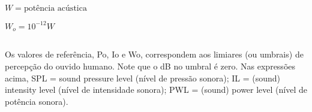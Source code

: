         $W = \text{potência acústica}$

        $W_{o} = 10^{-12} W $
        
    \subsection*{}
    Os valores de referência, Po, Io e Wo, correspondem aos limiares (ou umbrais) de percepção do ouvido humano. Note que o dB no umbral é zero. Nas expressões acima, SPL = sound pressure level (nível de pressão sonora); IL = (sound) intensity level (nível de intensidade sonora); PWL = (sound) power level (nível de potência sonora). 


